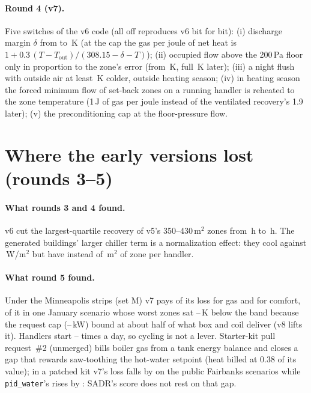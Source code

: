 \documentclass{article}
\begin{document}
\paragraph{Round 4 (v7).}
\label{sec:v7}
Five switches of the v6 code (all off reproduces v6 bit for bit): (i) discharge margin $\delta$ from
\VSixDischMargin{} to \ParRFDischMargin\,K (at the cap the gas per joule of net heat is
$1 + 0.3\,(T - T_{\text{out}})/(308.15 - \delta - T)$); (ii) occupied flow above the 200\,Pa floor only in
proportion to the zone's error (from \ParRFOccEzero\,K, full \ParRFOccSpan\,K later); (iii) a night flush with
outside air at least \ParRFFlushDt\,K colder, outside heating season; (iv) in heating season the forced minimum
flow of set-back zones on a running handler is reheated to the zone temperature (1\,J of gas per joule instead
of the ventilated recovery's 1.9 later); (v) the preconditioning cap at the floor-pressure flow.

\section{Where the early versions lost (rounds 3--5)}
\label{app:diag}
\paragraph{What rounds 3 and 4 found.}
v6 cut the largest-quartile recovery of v5's 350--430\,m$^2$ zones from \DecHeldRVFiveRecoveryBig\,h to
\DecHeldROursRecoveryBig\,h. The generated buildings' larger chiller term is a normalization effect: they cool
\RFCoolWmRThree{} against \RFCoolWmPub\,W/m$^2$ but have \RFAreaPerAhuRThree{} instead of \RFAreaPerAhuPub\,m$^2$ of zone per handler.

\paragraph{What round 5 found.}
Under the Minneapolis strips (set M) v7 pays \RFiveDecMinnGasShare{} of its loss for gas and
\RFiveDecMinnComfortShare{} for comfort, \RFiveCapComfortShareOfMinn{} of it in one January scenario whose
\RFiveCapNZones{} worst zones sat \RFiveCapDefMin--\RFiveCapDefMax\,K below the band because the request cap
(\RFiveCapReqKwMin--\RFiveCapReqKwMax\,kW) bound at about half of what box and coil deliver (v8 lifts it). Handlers
start \RFiveAhuStartsMin--\RFiveAhuStartsMax{} times a day, so cycling is not a lever. Starter-kit pull request~\#2
(unmerged) bills boiler gas from a tank energy balance and closes a gap that rewards saw-toothing the hot-water
setpoint (heat billed at 0.38 of its value); in a patched kit v7's loss falls by \RFivePrTwoVSevenRelAbs{} on the
\RFivePrTwoVSevenN{} public Fairbanks scenarios while \texttt{pid\_water}'s rises by \RFivePrTwoPidRelAbs: SADR's score
does not rest on that gap.
\end{document}
